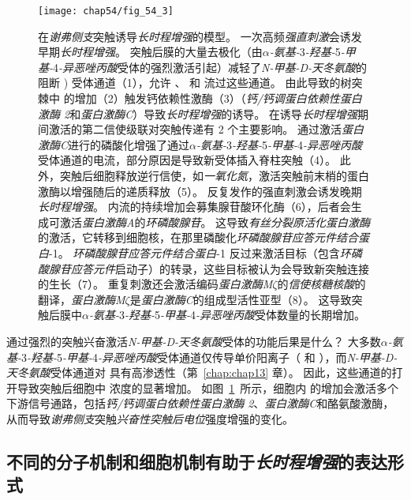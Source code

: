 \begin{figure}[htbp]
	\centering
	\texttt{[image: chap54/fig\_54\_3]}
	\caption{在\textit{谢弗侧支}突触诱导\textit{长时程增强}的模型。
		一次高频\textit{强直刺激}会诱发早期\textit{长时程增强}。
		突触后膜的大量去极化（由\textit{$\alpha$-氨基-}3\textit{-羟基-}5\textit{-甲基-}4\textit{-异恶唑丙酸}受体的强烈激活引起）减轻了\textit{N-甲基-D-天冬氨酸}的  阻断 ) 受体通道（1），允许 、 和  流过这些通道。
		由此导致的树突棘中  的增加（2）触发钙依赖性激酶（3）（\textit{钙/钙调蛋白依赖性蛋白激酶 2}和\textit{蛋白激酶C}）导致\textit{长时程增强}的诱导。
		在诱导\textit{长时程增强}期间激活的第二信使级联对突触传递有 2 个主要影响。
		通过激活\textit{蛋白激酶C}进行的磷酸化增强了通过\textit{$\alpha$-氨基-}3\textit{-羟基-}5\textit{-甲基-}4\textit{-异恶唑丙酸}受体通道的电流，部分原因是导致新受体插入脊柱突触（4）。
		此外，突触后细胞释放逆行信使，如\textit{一氧化氮}，激活突触前末梢的蛋白激酶以增强随后的递质释放（5）。
		反复发作的强直刺激会诱发晚期\textit{长时程增强}。
		 内流的持续增加会募集腺苷酸环化酶（6），后者会生成可激活\textit{蛋白激酶A}的\textit{环磷酸腺苷}。
		这导致\textit{有丝分裂原活化蛋白激酶}的激活，它转移到细胞核，在那里磷酸化\textit{环磷酸腺苷应答元件结合蛋白}-1。
		\textit{环磷酸腺苷应答元件结合蛋白}-1 反过来激活目标（包含\textit{环磷酸腺苷应答元件}启动子）的转录，这些目标被认为会导致新突触连接的生长（7）。
		重复刺激还会激活编码\textit{蛋白激酶M$\zeta$}的\textit{信使核糖核酸}的翻译，\textit{蛋白激酶M$\zeta$}是\textit{蛋白激酶C}的组成型活性亚型（8）。
		这导致突触后膜中\textit{$\alpha$-氨基-}3\textit{-羟基-}5\textit{-甲基-}4\textit{-异恶唑丙酸}受体数量的长期增加。}
	\label{fig:54_3}
\end{figure}


通过强烈的突触兴奋激活\textit{N-甲基-D-天冬氨酸}受体的功能后果是什么？
大多数\textit{$\alpha$-氨基-}3\textit{-羟基-}5\textit{-甲基-}4\textit{-异恶唑丙酸}受体通道仅传导单价阳离子（ 和 ），而\textit{N-甲基-D-天冬氨酸}受体通道对  具有高渗透性（第~\ref{chap:chap13} 章）。
因此，这些通道的打开导致突触后细胞中  浓度的显著增加。
如图~\ref{fig:54_3}~所示，细胞内  的增加会激活多个下游信号通路，包括\textit{钙/钙调蛋白依赖性蛋白激酶 2}、\textit{蛋白激酶C}和酪氨酸激酶，从而导致\textit{谢弗侧支}突触\textit{兴奋性突触后电位}强度增强的变化。



\subsection{不同的分子机制和细胞机制有助于\textit{长时程增强}的表达形式}

